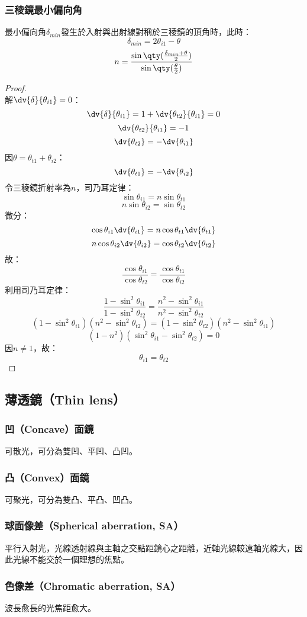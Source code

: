 \documentclass[a4paper,12pt]{report}
\begin{document}
\subsubsection{三稜鏡最小偏向角}
最小偏向角$\delta_{min}$發生於入射與出射線對稱於三稜鏡的頂角時，此時：
\[\delta_{min}=2\theta_{i1}-\theta\]
\[n=\frac{\sin\qty(\frac{\delta_{min}+\theta}{2})}{\sin\qty(\frac{\theta}{2})}\]
\begin{proof}\mbox{}\\
解$\dv{\delta}{\theta_{i1}}=0$：
\[\dv{\delta}{\theta_{i1}}=1+\dv{\theta_{t2}}{\theta_{i1}}=0\]
\[\dv{\theta_{t2}}{\theta_{i1}}=-1\]
\[\dv{\theta_{t2}}=-\dv{\theta_{i1}}\]
因$\theta=\theta_{t1}+\theta_{i2}$：
\[\dv{\theta_{t1}}=-\dv{\theta_{i2}}\]
令三稜鏡折射率為$n$，司乃耳定律：
\[\sin\theta_{i1}=n\sin\theta_{t1}\]
\[n\sin\theta_{i2}=\sin\theta_{t2}\]
微分：
\[\cos\theta_{i1}\dv{\theta_{i1}}=n\cos\theta_{t1}\dv{\theta_{t1}}\]
\[n\cos\theta_{i2}\dv{\theta_{i2}}=\cos\theta_{t2}\dv{\theta_{t2}}\]
故：
\[\frac{\cos\theta_{i1}}{\cos\theta_{t2}}=\frac{\cos\theta_{t1}}{\cos\theta_{i2}}\]
利用司乃耳定律：
\[\frac{1-\sin^2\theta_{i1}}{1-\sin^2\theta_{t2}}=\frac{n^2-\sin^2\theta_{i1}}{n^2-\sin^2\theta_{t2}}\]
\[(1-\sin^2\theta_{i1})(n^2-\sin^2\theta_{t2})=(1-\sin^2\theta_{t2})(n^2-\sin^2\theta_{i1})\]
\[(1-n^2)(\sin^2\theta_{i1}-\sin^2\theta_{t2})=0\]
因$n\neq 1$，故：
\[\theta_{i1}=\theta_{t2}\]
\end{proof}
\subsection{薄透鏡（Thin lens）}
\subsubsection{凹（Concave）面鏡}
可散光，可分為雙凹、平凹、凸凹。
\subsubsection{凸（Convex）面鏡}
可聚光，可分為雙凸、平凸、凹凸。
\subsubsection{球面像差（Spherical aberration, SA）}
平行入射光，光線透射線與主軸之交點距鏡心之距離，近軸光線較遠軸光線大，因此光線不能交於一個理想的焦點。
\subsubsection{色像差（Chromatic aberration, SA）}
波長愈長的光焦距愈大。
\end{document}
